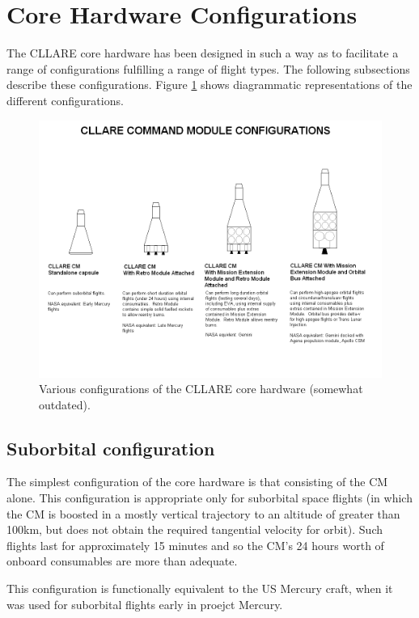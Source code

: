 \documentclass{report}
\begin{document}
\section{Core Hardware Configurations} \label{sec:config}

The CLLARE core hardware has been designed in such a way as to facilitate a range of configurations fulfilling a range of flight types.  The following subsections describe these configurations.  Figure \ref{fig:configs} shows diagrammatic representations of the different configurations.

\begin{figure}[h] \label{fig:configs}
\includegraphics[angle=270, scale=0.6]{images/cllare_cm_configs}
\caption{Various configurations of the CLLARE core hardware (somewhat outdated).}
\end{figure}

\subsection{Suborbital configuration}

The simplest configuration of the core hardware is that consisting of the CM alone.  This configuration is appropriate only for suborbital space flights (in which the CM is boosted in a mostly vertical trajectory to an altitude of greater than 100km, but does not obtain the required tangential velocity for orbit).  Such flights last for approximately 15 minutes and so the CM's 24 hours worth of onboard consumables are more than adequate.
 
This configuration is functionally equivalent to the US Mercury craft, when it was used for suborbital flights early in proejct Mercury.
\end{document}
